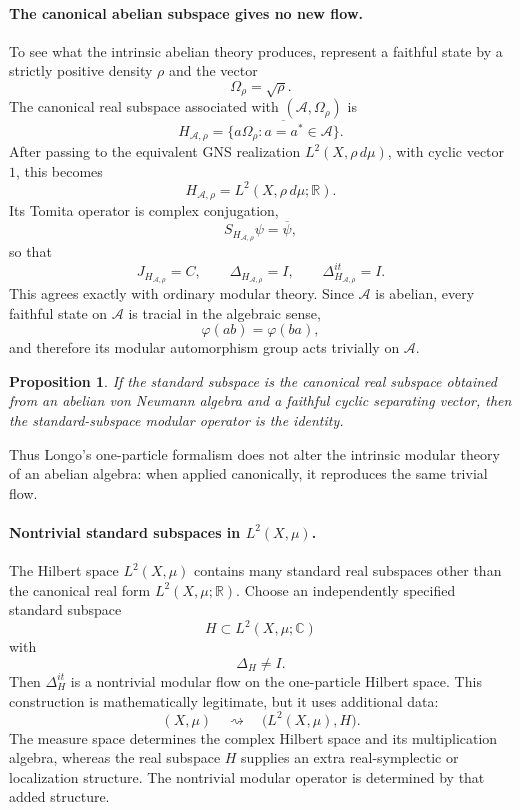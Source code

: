 \documentclass[a4paper,11pt]{article}
\newtheorem{proposition}[theorem]{Proposition}
\theoremstyle{definition}
\begin{document}
\paragraph{The canonical abelian subspace gives no new flow.}
To see what the intrinsic abelian theory produces, represent a faithful state by a strictly positive density \(\rho\) and the vector
\[
    \Omega_\rho=\sqrt{\rho}.
\]
The canonical real subspace associated with \((\mathcal{A},\Omega_\rho)\) is
\[
    H_{\mathcal{A},\rho}
    =\overline{\{a\Omega_\rho:a=a^*\in\mathcal{A}\}}.
\]
After passing to the equivalent GNS realization \(L^2(X,\rho\,d\mu)\), with cyclic vector \(1\), this becomes
\[
    H_{\mathcal{A},\rho}=L^2(X,\rho\,d\mu;\mathbb{R}).
\]
Its Tomita operator is complex conjugation,
\[
    S_{H_{\mathcal{A},\rho}}\psi=\overline{\psi},
\]
so that
\[
    J_{H_{\mathcal{A},\rho}}=C,
    \qquad
    \Delta_{H_{\mathcal{A},\rho}}=I,
    \qquad
    \Delta_{H_{\mathcal{A},\rho}}^{it}=I.
\]
This agrees exactly with ordinary modular theory. Since \(\mathcal{A}\) is abelian, every faithful state on \(\mathcal{A}\) is tracial in the algebraic sense,
\[
    \varphi(ab)=\varphi(ba),
\]
and therefore its modular automorphism group acts trivially on \(\mathcal{A}\).

\begin{proposition}
If the standard subspace is the canonical real subspace obtained from an abelian von Neumann algebra and a faithful cyclic separating vector, then the standard-subspace modular operator is the identity.
\end{proposition}

Thus Longo's one-particle formalism does not alter the intrinsic modular theory of an abelian algebra: when applied canonically, it reproduces the same trivial flow.

\paragraph{Nontrivial standard subspaces in \(L^2(X,\mu)\).}
The Hilbert space \(L^2(X,\mu)\) contains many standard real subspaces other than the canonical real form \(L^2(X,\mu;\mathbb{R})\). Choose an independently specified standard subspace
\[
    H\subset L^2(X,\mu;\mathbb{C})
\]
with
\[
    \Delta_H\neq I.
\]
Then \(\Delta_H^{it}\) is a nontrivial modular flow on the one-particle Hilbert space. This construction is mathematically legitimate, but it uses additional data:
\[
    (X,\mu)
    \quad\rightsquigarrow\quad
    \bigl(L^2(X,\mu),H\bigr).
\]
The measure space determines the complex Hilbert space and its multiplication algebra, whereas the real subspace \(H\) supplies an extra real-symplectic or localization structure. The nontrivial modular operator is determined by that added structure.
\end{document}
